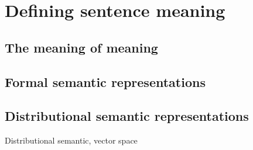 \setchapterpreamble[u]{\margintoc}
\chapter{Defining sentence meaning}

\section{The meaning of meaning}

\section{Formal semantic representations}

\section{Distributional semantic representations}

Distributional semantic, vector space